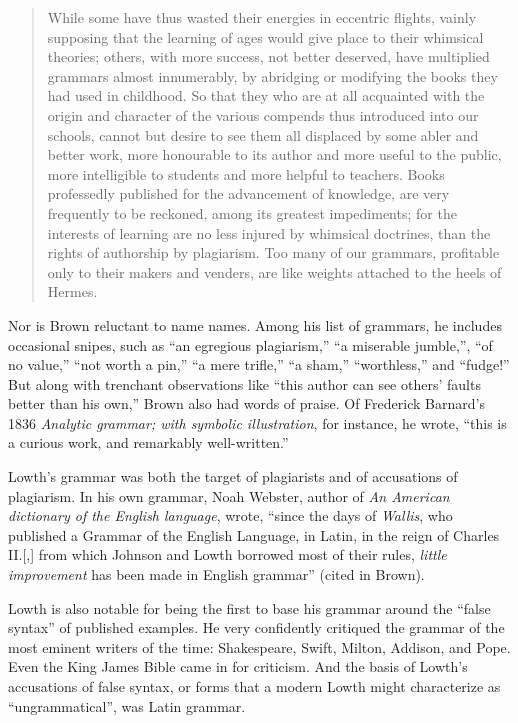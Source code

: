 \begin{quote}
    While some have thus wasted their energies in eccentric flights, vainly supposing that the learning of ages would give place to their whimsical theories; others, with more success, not better deserved, have multiplied grammars almost innumerably, by abridging or modifying the books they had used in childhood. So that they who are at all acquainted with the origin and character of the various compends thus introduced into our schools, cannot but desire to see them all displaced by some abler and better work, more honourable to its author and more useful to the public, more intelligible to students and more helpful to teachers. Books professedly published for the advancement of knowledge, are very frequently to be reckoned, among its greatest impediments; for the interests of learning are no less injured by whimsical doctrines, than the rights of authorship by plagiarism. Too many of our grammars, profitable only to their makers and venders, are like weights attached to the heels of Hermes. \\ \phantom{xxx}\hfill \citep[35]{brown_grammar_grammars}
\end{quote}

Nor is Brown reluctant to name names. Among his list of grammars, he includes occasional snipes, such as ``an egregious plagiarism,'' ``a miserable jumble,'', ``of no value,'' ``not worth a pin,'' ``a mere trifle,'' ``a sham,'' ``worthless,'' and ``fudge!'' But along with trenchant observations like ``this author can see others' faults better than his own,'' Brown also had words of praise. Of Frederick Barnard's 1836 \textit{Analytic grammar; with symbolic illustration}, for instance, he wrote, ``this is a curious work, and remarkably well-written.''

Lowth's grammar was both the target of plagiarists and of accusations of plagiarism. In his own grammar, Noah Webster, author of \textit{An American dictionary of the English language}, wrote, ``since the days of \textit{Wallis}, who published a Grammar of the English Language, in Latin, in the reign of Charles II.[,] from which Johnson and Lowth borrowed most of their rules, \textit{little improvement} has been made in English grammar'' (cited in Brown).

Lowth is also notable for being the first to base his grammar around the ``false syntax'' of published examples. He very confidently critiqued the grammar of the most eminent writers of the time: Shakespeare, Swift, Milton, Addison, and Pope. Even the King James Bible came in for criticism. And the basis of Lowth's accusations of false syntax, or forms that a modern Lowth might characterize as ``ungrammatical'', was Latin grammar.

